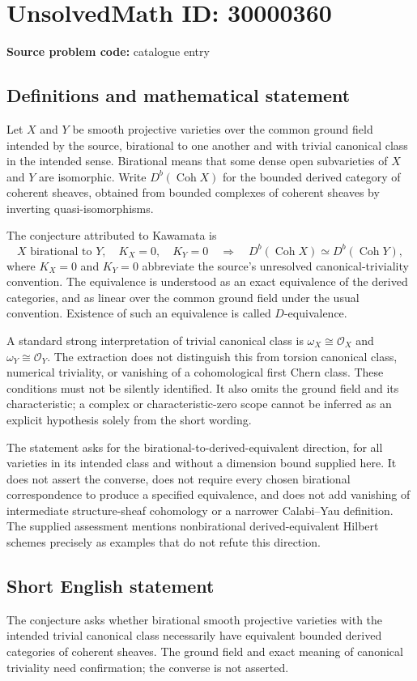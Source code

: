 \documentclass[11pt]{article}
\begin{document}
\section*{UnsolvedMath ID: 30000360}
\textbf{Source problem code:} catalogue entry
\subsection{Definitions and mathematical statement}
Let $X$ and $Y$ be smooth projective varieties over the common ground field intended by the source, birational to one another and with trivial canonical class in the intended sense. Birational means that some dense open subvarieties of $X$ and $Y$ are isomorphic. Write $D^b(\operatorname{Coh}X)$ for the bounded derived category of coherent sheaves, obtained from bounded complexes of coherent sheaves by inverting quasi-isomorphisms.

The conjecture attributed to Kawamata is
\[
 X\text{ birational to }Y,\quad K_X=0,\quad K_Y=0
 \quad\Longrightarrow\quad
 D^b(\operatorname{Coh}X)\simeq D^b(\operatorname{Coh}Y),
\]
where $K_X=0$ and $K_Y=0$ abbreviate the source's unresolved canonical-triviality convention. The equivalence is understood as an exact equivalence of the derived categories, and as linear over the common ground field under the usual convention. Existence of such an equivalence is called $D$-equivalence.

A standard strong interpretation of trivial canonical class is $\omega_X\cong\mathcal O_X$ and $\omega_Y\cong\mathcal O_Y$. The extraction does not distinguish this from torsion canonical class, numerical triviality, or vanishing of a cohomological first Chern class. These conditions must not be silently identified. It also omits the ground field and its characteristic; a complex or characteristic-zero scope cannot be inferred as an explicit hypothesis solely from the short wording.

The statement asks for the birational-to-derived-equivalent direction, for all varieties in its intended class and without a dimension bound supplied here. It does not assert the converse, does not require every chosen birational correspondence to produce a specified equivalence, and does not add vanishing of intermediate structure-sheaf cohomology or a narrower Calabi--Yau definition. The supplied assessment mentions nonbirational derived-equivalent Hilbert schemes precisely as examples that do not refute this direction.
\subsection{Short English statement}
The conjecture asks whether birational smooth projective varieties with the intended trivial canonical class necessarily have equivalent bounded derived categories of coherent sheaves. The ground field and exact meaning of canonical triviality need confirmation; the converse is not asserted.
\end{document}
